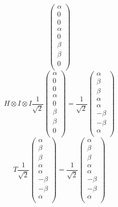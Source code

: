 \documentclass[11pt,fleqn]{article}
\begin{document}
\begin{enumerate}
\[ \left( \begin{array}{cccccccc}
\alpha \\
0 \\
0 \\
\alpha \\
0  \\
\beta \\
\beta \\
0 \\ 
\end{array} \right)
\]
\[
H \otimes I \otimes I \frac{1}{\sqrt{2}}
 \left( \begin{array}{cccccccc}
\alpha \\
0 \\
0 \\
\alpha \\
0  \\
\beta \\
\beta \\
0 \\ 
\end{array} \right) = \frac{1}{\sqrt{2}}
 \left( \begin{array}{cccccccc}
\alpha \\
\beta \\
\beta \\
\alpha \\
\alpha \\
-\beta \\
-\beta \\
\alpha \\ 
\end{array} \right) 
\]
\[
T  \frac{1}{\sqrt{2}}
 \left( \begin{array}{cccccccc}
\alpha \\
\beta \\
\beta \\
\alpha \\
\alpha \\
-\beta \\
-\beta \\
\alpha \\ 
\end{array} \right)  = \frac{1}{\sqrt{2}}
 \left( \begin{array}{cccccccc}
\alpha \\
\beta \\
\beta \\
\alpha \\
\alpha \\
-\beta \\
-\beta \\
\alpha \\ 
\end{array} \right) 
\]



\end{enumerate}
\end{document}
